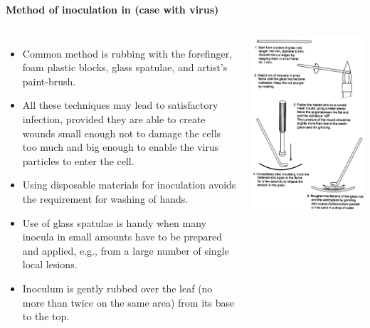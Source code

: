 \documentclass[11pt,dvipsnames,ignorenonframetext,aspectratio=169]{beamer}
\providecommand{\tightlist}{%
  \setlength{\itemsep}{0pt}\setlength{\parskip}{0pt}}
\newcommand{\bcolumns}{\begin{columns}[T, onlytextwidth]}
\newcommand{\ecolumns}{\end{columns}}
\begin{document}
\begin{frame}{}
\protect\hypertarget{section-3}{}
\textbf{Method of inoculation in (case with virus)}

\bcolumns
{}
\small

\begin{itemize}
\tightlist
\item
  Common method is rubbing with the forefinger, foam plastic blocks,
  glass spatulae, and artist's paint-brush.
\item
  All these techniques may lead to satisfactory infection, provided they
  are able to create wounds small enough not to damage the cells too
  much and big enough to enable the virus particles to enter the cell.
\item
  Using disposable materials for inoculation avoids the requirement for
  washing of hands.
\item
  Use of glass spatulae is handy when many inocula in small amounts have
  to be prepared and applied, e.g., from a large number of single local
  lesions.
\item
  Inoculum is gently rubbed over the leaf (no more than twice on the
  same area) from its base to the top.
\end{itemize}


\begin{center}\includegraphics[width=0.76\linewidth]{../images/glass_spatula_for_mechanical_inoculation} \end{center}

\ecolumns
\end{frame}
\end{document}
